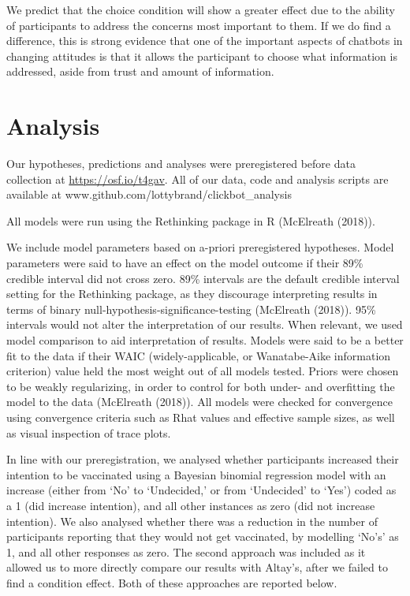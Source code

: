 \documentclass[
  english,
  ,jou,floatsintext]{apa6}
\begin{document}
We predict that the choice condition will show a greater effect due to the ability of participants to address the concerns most important to them. If we do find a difference, this is strong evidence that one of the important aspects of chatbots in changing attitudes is that it allows the participant to choose what information is addressed, aside from trust and amount of information.

\hypertarget{analysis}{%
\section{Analysis}\label{analysis}}

Our hypotheses, predictions and analyses were preregistered before data collection at \url{https://osf.io/t4gav}. All of our data, code and analysis scripts are available at www.github.com/lottybrand/clickbot\_analysis

All models were run using the Rethinking package in R (McElreath (2018)).

We include model parameters based on a-priori preregistered hypotheses. Model parameters were said to have an effect on the model outcome if their 89\% credible interval did not cross zero. 89\% intervals are the default credible interval setting for the Rethinking package, as they discourage interpreting results in terms of binary null-hypothesis-significance-testing (McElreath (2018)). 95\% intervals would not alter the interpretation of our results. When relevant, we used model comparison to aid interpretation of results. Models were said to be a better fit to the data if their WAIC (widely-applicable, or Wanatabe-Aike information criterion) value held the most weight out of all models tested.
Priors were chosen to be weakly regularizing, in order to control for both under- and overfitting the model to the data (McElreath (2018)). All models were checked for convergence using convergence criteria such as Rhat values and effective sample sizes, as well as visual inspection of trace plots.

In line with our preregistration, we analysed whether participants increased their intention to be vaccinated using a Bayesian binomial regression model with an increase (either from `No' to `Undecided,' or from `Undecided' to `Yes') coded as a 1 (did increase intention), and all other instances as zero (did not increase intention). We also analysed whether there was a reduction in the number of participants reporting that they would not get vaccinated, by modelling `No's' as 1, and all other responses as zero. The second approach was included as it allowed us to more directly compare our results with Altay's, after we failed to find a condition effect. Both of these approaches are reported below.
\end{document}
